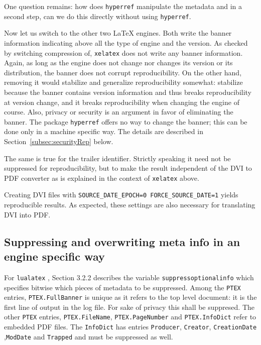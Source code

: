 \documentclass[a4paper, english]{article}%
\newcommand{\lualatex}{\texttt{lualatex}}
\newcommand{\xelatex}{\texttt{xelatex}}
\begin{document}
One question remains: how does \texttt{hyperref} manipulate the metadata 
and in a second step, can we do this directly without using \texttt{hyperref}. 
\medskip


Now let us switch to the other two \LaTeX{} engines. 
Both write the banner information indicating 
above all the type of engine and the version. 
As checked by switching compression of, \xelatex{} does not write any banner information. 
Again, as long as the engine does not change nor changes its version or its distribution, 
the banner does not corrupt reproducibility. 
On the other hand, removing it would stabilize and generalize reproducibility somewhat: 
stabilize because the banner contains version information 
and thus breaks reproducibility at version change, 
and it breaks reproducibility when changing the engine of course. 
Also, privacy or security is an argument in favor of eliminating the banner. 
The package \texttt{hyperref} offers no way to change the banner; 
this can be done only in a machine specific way. 
The details are described in Section~\ref{subsec:securityRep} below. 

The same is true for the trailer identifier. 
Strictly speaking it need not be suppressed for reproducibility, 
but to make the result independent of the DVI to PDF converter 
as is explained in the context of \xelatex{} above. 

Creating DVI files with \texttt{SOURCE\_DATE\_EPOCH=0 FORCE\_SOURCE\_DATE=1} 
yields reproducible results. 
As expected, these settings are also necessary for translating DVI into PDF\@. 

\subsection{Suppressing and overwriting meta info in an engine specific way }

For \lualatex{} \cite{LuaTexRef24}, Section 3.2.2 describes the variable \texttt{suppressoptionalinfo} 
which specifies bitwise which pieces of metadata to be suppressed. 
Among the \texttt{PTEX} entries, \texttt{PTEX.FullBanner} is unique as it refers to the top level document: 
it is the first line of output in the log file. 
For sake of privacy this shall be suppresed. 
The other \texttt{PTEX} entries, 
\texttt{PTEX.FileName}, \texttt{PTEX.PageNumber} and \texttt{PTEX.InfoDict} 
refer to embedded PDF files. 
The \texttt{InfoDict} has entries \texttt{Producer}, \texttt{Creator}, \texttt{CreationDate} ,\texttt{ModDate} 
and \texttt{Trapped} and must be suppressed as well. 
\end{document}

